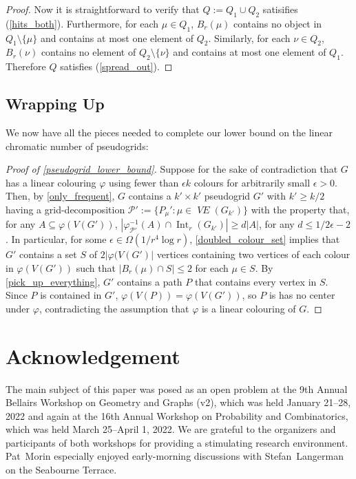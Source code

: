 \documentclass{patmorin}
\DeclareMathOperator{\interior}{Int}
\DeclareMathOperator{\VE}{\mathit{VE}}
\begin{document}
\begin{proof}
  Now it is straightforward to verify that $Q:=Q_1\cup Q_2$ satisifies (\ref{hits_both}).  Furthermore, for each $\mu\in Q_1$, $B_r(\mu)$ contains no object in $Q_1\setminus\{\mu\}$ and contains at most one element of $Q_2$.  Similarly, for each $\nu\in Q_2$, $B_r(\nu)$ contains no element of $Q_2\setminus\{\nu\}$ and contains at most one element of $Q_1$.  Therefore $Q$ satisfies (\ref{spread_out}).
\end{proof}

\subsection{Wrapping Up}
\label{wrapping_up}

We now have all the pieces needed to complete our lower bound on the linear chromatic number of pseudogrids:

\begin{proof}[Proof of \cref{pseudogrid_lower_bound}]
  Suppose for the sake of contradiction that $G$ has a linear colouring $\varphi$ using fewer than $\epsilon k$ colours for arbitrarily small $\epsilon >0$.  Then, by \cref{only_frequent}, $G$ contains a $k'\times k'$ pseudogrid $G'$ with $k'\ge k/2$ having a grid-decomposition $\mathcal{P}':=\{P_\mu':\mu\in \VE(G_{k'})\}$ with the property that, for any $A\subseteq\varphi(V(G'))$, $|\varphi^{-1}_{\mathcal{P'}}(A)\cap\interior_r(G_{k'})|\ge d|A|$, for any $d\le 1/2\epsilon-2$.  In particular, for some $\epsilon \in \Omega(1/r^4\log r)$, \cref{doubled_colour_set} implies that $G'$ contains a set $S$ of $2|\varphi(V(G')|$ vertices containing two vertices of each colour in $\varphi(V(G'))$ such that $|B_r(\mu)\cap S|\le 2$ for each $\mu\in S$.  By \cref{pick_up_everything}, $G'$ contains a path $P$ that contains every vertex in $S$.  Since $P$ is contained in $G'$, $\varphi(V(P))=\varphi(V(G'))$, so $P$ is has no center under $\varphi$, contradicting the assumption that $\varphi$ is a linear colouring of $G$.
\end{proof}


\section*{Acknowledgement}

The main subject of this paper was posed as an open problem at the 9th Annual Bellairs Workshop on Geometry and Graphs (v2), which was held January 21--28, 2022 and again at the 16th Annual Workshop on Probability and Combinatorics, which was held March 25--April 1, 2022. We are grateful to the organizers and participants of both workshops for providing a stimulating research environment.
Pat~Morin especially enjoyed early-morning discussions with Stefan~Langerman on the Seabourne Terrace.
\end{document}
